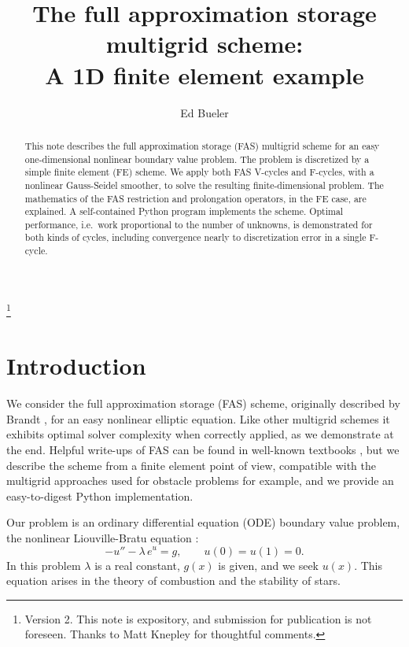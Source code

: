 \documentclass[letterpaper,final,12pt,reqno]{amsart}
\begin{document}
\title[The FAS multigrid scheme]{The full approximation storage multigrid scheme: \\ A 1D finite element example}

\author{Ed Bueler}

\begin{abstract}  This note describes the full approximation storage (FAS) multigrid scheme for an easy one-dimensional nonlinear boundary value problem.  The problem is discretized by a simple finite element (FE) scheme.  We apply both FAS V-cycles and F-cycles, with a nonlinear Gauss-Seidel smoother, to solve the resulting finite-dimensional problem.  The mathematics of the FAS restriction and prolongation operators, in the FE case, are explained.  A self-contained Python program implements the scheme.  Optimal performance, i.e.~work proportional to the number of unknowns, is demonstrated for both kinds of cycles, including convergence nearly to discretization error in a single F-cycle.  \end{abstract}

\thanks{Version 2.  This note is expository, and submission for publication is not foreseen.  Thanks to Matt Knepley for thoughtful comments.}

\maketitle

\tableofcontents

\thispagestyle{empty}
\bigskip

\section{Introduction}  \label{sec:intro}

We consider the full approximation storage (FAS) scheme, originally described by Brandt \cite{Brandt1977}, for an easy nonlinear elliptic equation.  Like other multigrid schemes it exhibits optimal solver complexity \cite{Bueler2021} when correctly applied, as we demonstrate at the end.  Helpful write-ups of FAS can be found in well-known textbooks \cite{BrandtLivne2011,Briggsetal2000,Trottenbergetal2001}, but we describe the scheme from a finite element point of view, compatible with the multigrid approaches used for obstacle problems \cite{GraeserKornhuber2009} for example, and we provide an easy-to-digest Python implementation.

Our problem is an ordinary differential equation (ODE) boundary value problem, the nonlinear Liouville-Bratu equation \cite{Bratu1914,Liouville1853}:
\begin{equation}
  -u'' - \lambda\, e^u = g,  \qquad u(0) = u(1) = 0.  \label{liouvillebratu}
\end{equation}
In this problem $\lambda$ is a real constant, $g(x)$ is given, and we seek $u(x)$.  This equation arises in the theory of combustion \cite{FrankKameneckij1955} and the stability of stars.
\end{document}
